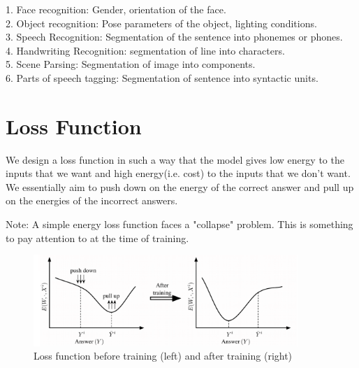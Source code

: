 1. Face recognition: Gender, orientation of the face. \\
2. Object recognition: Pose parameters of the object, lighting conditions.\\
3. Speech Recognition: Segmentation of the sentence into phonemes or phones.\\
4. Handwriting Recognition: segmentation of line into characters.\\
5. Scene Parsing: Segmentation of image into components.\\
6. Parts of speech tagging: Segmentation of sentence into syntactic units.\\

\section{Loss Function}

We design a loss function in such a way that the model gives low energy to the inputs that we want and high energy(i.e. cost) to the inputs that we don’t want. We essentially aim to push down on the energy of the correct answer and pull up on the energies of the incorrect answers.

Note: A simple energy loss function faces a "collapse" problem. This is something to pay attention to at the time of training.

\begin{figure}[t]
\centering
\includegraphics[width=100mm]{lectures/08-b/4.png}
\caption{Loss function before training (left) and after training (right)}
\end{figure}

